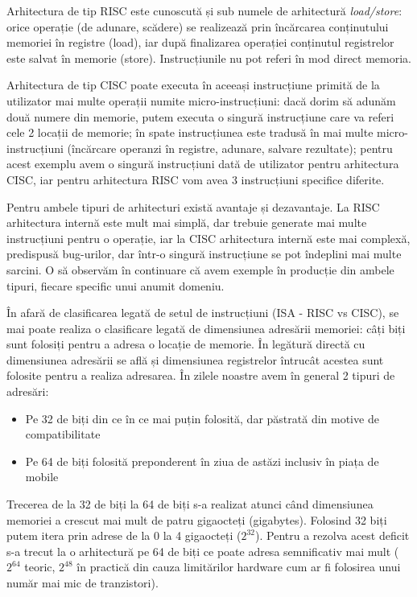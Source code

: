 Arhitectura de tip RISC este cunoscută și sub numele de arhitectură
\textit{load/store}:
orice operație (de adunare, scădere) se realizează prin încărcarea conținutului
memoriei în registre (load), iar după finalizarea operației conținutul
registrelor este salvat în memorie (store). Instrucțiunile nu pot referi în mod
direct memoria.

Arhitectura de tip CISC poate executa în aceeași instrucțiune primită de la
utilizator mai multe operații numite micro-instrucțiuni: dacă dorim să adunăm
două numere din memorie, putem executa o singură instrucțiune care va referi
cele 2 locații de memorie; în spate instrucțiunea este tradusă în mai multe
micro-instrucțiuni (încărcare operanzi în registre, adunare, salvare rezultate);
pentru acest exemplu avem o singură instrucțiuni dată de utilizator pentru
arhitectura CISC, iar pentru arhitectura RISC vom avea 3 instrucțiuni specifice
diferite.

Pentru ambele tipuri de arhitecturi există avantaje și dezavantaje. La RISC
arhitectura internă este mult mai simplă, dar trebuie generate mai multe
instrucțiuni pentru o operație, iar la CISC arhitectura internă este mai
complexă, predispusă bug-urilor, dar într-o singură instrucțiune se pot
îndeplini mai multe sarcini. O să observăm în continuare că avem exemple în
producție din ambele tipuri, fiecare specific unui anumit domeniu.

În afară de clasificarea legată de setul de instrucțiuni (ISA - RISC vs CISC),
se mai poate realiza o clasificare legată de dimensiunea adresării memoriei:
câți biți sunt folosiți pentru a adresa o locație de memorie. În legătură
directă cu dimensiunea adresării se află și dimensiunea registrelor întrucât
acestea sunt folosite pentru a realiza adresarea. În zilele noastre avem în
general 2 tipuri de adresări:

\begin{itemize}
	\item Pe 32 de biți din ce în ce mai puțin folosită, dar păstrată din
		motive de compatibilitate
	\item Pe 64 de biți folosită preponderent în ziua de astăzi inclusiv în
		piața de mobile
\end{itemize}

Trecerea de la 32 de biți la 64 de biți s-a realizat atunci când dimensiunea
memoriei a crescut mai mult de patru gigaocteți (gigabytes). Folosind 32 biți
putem itera prin adrese de la 0 la 4 gigaocteți ($2^{32}$). Pentru a rezolva
acest deficit s-a trecut la o arhitectură pe 64 de biți ce poate adresa
semnificativ mai mult ($2^{64}$ teoric, $2^{48}$ în practică din cauza
limitărilor hardware cum ar fi folosirea unui număr mai mic de tranzistori).

